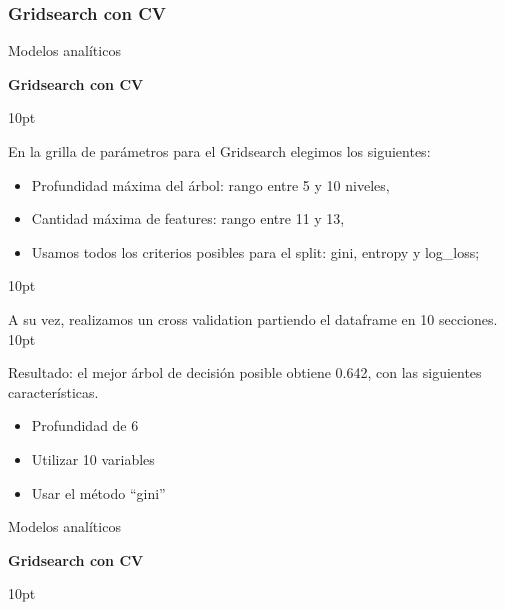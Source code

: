 \documentclass[pdf]{beamer}
\def\vspace{}%
\begin{document}
{    \subsubsection{Gridsearch con CV}

\begin{frame}{Modelos analíticos}
    \begin{Large}
        \textbf{Gridsearch con CV}
    \end{Large}
    \vspace{10pt}
    
    En la grilla de parámetros para el Gridsearch elegimos los siguientes:
    \begin{itemize}
        \item Profundidad máxima del árbol: rango entre 5 y 10 niveles,
        \item Cantidad máxima de features: rango entre 11 y 13,
        \item Usamos todos los criterios posibles para el split: gini, entropy y log\_loss;
    \end{itemize}
    \vspace{10pt}

    A su vez, realizamos un cross validation partiendo el dataframe en 10 secciones.
    \vspace{10pt}

    Resultado: el mejor árbol de decisión posible obtiene 0.642, con las siguientes características.
    
    \begin{itemize}
        \item Profundidad de  6
        \item Utilizar  10  variables 
        \item Usar el método ``gini''
    \end{itemize}
\end{frame}
\begin{frame}{Modelos analíticos}
    
    \begin{Large}
        \textbf{Gridsearch con CV}
    \end{Large}
    \vspace{10pt}


\end{frame}}
\end{document}
